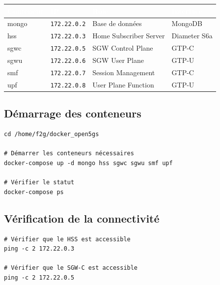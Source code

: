 \documentclass[11pt,a4paper]{article}
\newcommand{\ip}[1]{\texttt{\color{pkfblue}#1}}
\begin{document}
\begin{center}
\begin{tabular}{|l|l|l|l|}
\hline
\rowcolor{pkfblue}
\textcolor{white}{\textbf{Conteneur}} & \textcolor{white}{\textbf{IP}} & \textcolor{white}{\textbf{Rôle}} & \textcolor{white}{\textbf{Interface}} \\
\hline
mongo & \ip{172.22.0.2} & Base de données & MongoDB \\
\hline
hss & \ip{172.22.0.3} & Home Subscriber Server & Diameter S6a \\
\hline
sgwc & \ip{172.22.0.5} & SGW Control Plane & GTP-C \\
\hline
sgwu & \ip{172.22.0.6} & SGW User Plane & GTP-U \\
\hline
smf & \ip{172.22.0.7} & Session Management & GTP-C \\
\hline
upf & \ip{172.22.0.8} & User Plane Function & GTP-U \\
\hline
\end{tabular}
\end{center}

\subsection{Démarrage des conteneurs}

\begin{cmdbox}
\begin{lstlisting}[style=bashstyle]
cd /home/f2g/docker_open5gs

# Démarrer les conteneurs nécessaires
docker-compose up -d mongo hss sgwc sgwu smf upf

# Vérifier le statut
docker-compose ps
\end{lstlisting}
\end{cmdbox}

\subsection{Vérification de la connectivité}

\begin{successbox}
\begin{lstlisting}[style=bashstyle]
# Vérifier que le HSS est accessible
ping -c 2 172.22.0.3

# Vérifier que le SGW-C est accessible
ping -c 2 172.22.0.5
\end{lstlisting}
\end{successbox}

\newpage
\end{document}
